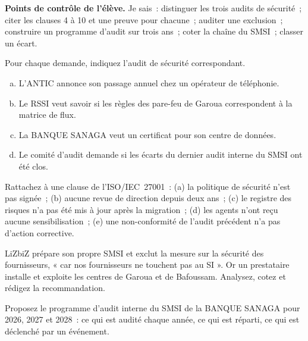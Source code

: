 \begin{boxinfo}
\textbf{Points de contrôle de l'élève.} Je sais~: distinguer les trois
audits de sécurité~; citer les clauses 4 à 10 et une preuve pour
chacune~; auditer une exclusion~; construire un programme d'audit sur
trois ans~; coter la chaîne du SMSI~; classer un écart.
\end{boxinfo}

\bigskip

\begin{boxexo}[title={\ding{45}\quad Exercice~20.1. Quel audit~? \niveaubase}]
Pour chaque demande, indiquez l'audit de sécurité correspondant.
\begin{enumerate}[(a)]
    \item L'ANTIC annonce son passage annuel chez un opérateur de
          téléphonie.
    \item Le RSSI veut savoir si les règles des pare-feu de Garoua
          correspondent à la matrice de flux.
    \item La BANQUE SANAGA veut un certificat pour son centre de données.
    \item Le comité d'audit demande si les écarts du dernier audit interne
          du SMSI ont été clos.
\end{enumerate}
\end{boxexo}

\begin{boxexo}[title={\ding{45}\quad Exercice~20.2. Quelle clause~? \niveaubase}]
Rattachez à une clause de l'ISO/IEC~27001~: (a) la politique de sécurité
n'est pas signée~; (b) aucune revue de direction depuis deux ans~; (c) le
registre des risques n'a pas été mis à jour après la migration~; (d) les
agents n'ont reçu aucune sensibilisation~; (e) une non-conformité de
l'audit précédent n'a pas d'action corrective.
\end{boxexo}

\begin{boxexo}[title={\ding{45}\quad Exercice~20.3. Auditer une exclusion \niveaumoyen}]
LiZbiZ prépare son propre SMSI et exclut la mesure sur la sécurité des
fournisseurs, « car nos fournisseurs ne touchent pas au SI ». Or un
prestataire installe et exploite les centres de Garoua et de Bafoussam.
Analysez, cotez et rédigez la recommandation.
\end{boxexo}

\begin{boxexo}[title={\ding{45}\quad Exercice~20.4. Le programme sur trois ans \niveaumoyen}]
Proposez le programme d'audit interne du SMSI de la BANQUE SANAGA pour
2026, 2027 et 2028~: ce qui est audité chaque année, ce qui est réparti, ce
qui est déclenché par un événement.
\end{boxexo}

